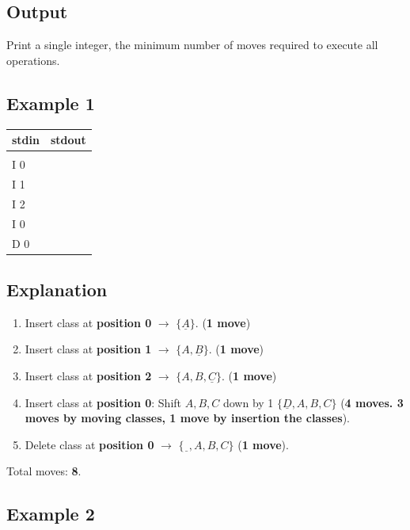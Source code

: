 \documentclass[12pt,a4paper]{article}
\begin{document}
\subsection*{\fontsize{16}{12}Output}
Print a single integer, the minimum number of moves required to execute all operations.
\subsection*{\fontsize{16}{12}Example 1}

\begin{table}[h]
  \centering
  \begin{tabularx}{\textwidth}{|>{\ttfamily}X|>{\ttfamily}X|}
  \hline
  \textbf{stdin} & \textbf{stdout} \\
  \hline
  5 & 8 \\
  I 0 &  \\
  I 1 & \\
  I 2 & \\
  I 0 &\\
  D 0 & \\
  \hline
 \end{tabularx}
\end{table}
\newpage
\subsection*{\fontsize{16}{12}Explanation}
\begin{enumerate}
    \item Insert class at \textbf{position 0} $\rightarrow$ \(\{\underline{A}\}\). (\textbf{1 move})
    \item Insert class at \textbf{position 1} $\rightarrow$ \(\{A, \underline{B}\}\). (\textbf{1 move})
    \item Insert class at \textbf{position 2}  $\rightarrow$ \(\{A, B, \underline{C}\}\). (\textbf{1 move})
    \item Insert class at \textbf{position 0}: Shift \( A, B, C \) down by 1 \(\{\underline{D}, A, B, C\}\) (\textbf{4 moves. 3 moves by moving classes, 1 move by insertion the classes}).
    \item Delete class at \textbf{position 0} $\rightarrow$ \(\{\underline{\ \ }, A, B, C\}\) (\textbf{1 move}).
\end{enumerate}
Total moves: \textbf{8}.

\subsection*{\fontsize{16}{12}Example 2}
\end{document}
